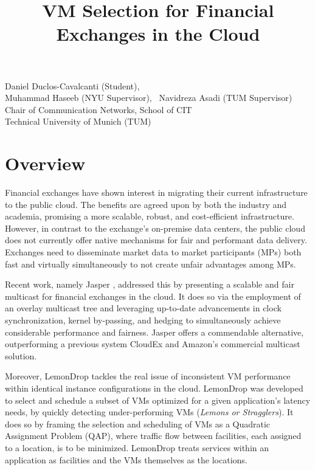 \documentclass{article}
\title{VM Selection for Financial Exchanges in the Cloud}
\makeatletter
\renewcommand{\maketitle}{%
    \thispagestyle{fancy}%
    \begin{center}
        \Large\bfseries\@title
    \end{center}
    \vspace{-0.25cm}
    \begin{center}
        Daniel Duclos-Cavalcanti (Student),
        \\
        Muhammad Haseeb (NYU Supervisor),
        ~Navidreza Asadi (TUM Supervisor) 
        \\Chair of Communication Networks, School of CIT
        \\Technical University of Munich (TUM)
    \end{center}
}
\makeatother
\begin{document}
\maketitle

\section{Overview}

Financial exchanges have shown interest in migrating their current infrastructure 
to the public cloud. The benefits are agreed upon by both the industry and 
academia, promising a more scalable, robust, and cost-efficient infrastructure. 
However, in contrast to the exchange's on-premise data centers, the public cloud does not 
currently offer native mechanisms for fair and performant data delivery. 
Exchanges need to disseminate market data to market participants (MPs) both fast and 
virtually simultaneously to not create unfair advantages among MPs.

Recent work, namely Jasper \cite{haseeb2024jasper}, addressed this by presenting a scalable and fair multicast 
for financial exchanges in the cloud. It does so via the employment of an overlay multicast tree and leveraging 
up-to-date advancements in clock synchronization, kernel by-passing, and hedging to simultaneously 
achieve considerable performance and fairness. Jasper offers a commendable alternative, 
outperforming a previous system CloudEx and Amazon's commercial multicast solution.

Moreover, LemonDrop \cite{sachidananda2022scheduling} tackles the real issue of 
inconsistent VM performance within identical instance configurations in the cloud. 
LemonDrop was developed to select and schedule a subset of VMs optimized for a given application's latency needs, by quickly 
detecting under-performing VMs (\textit{Lemons or Stragglers}).
It does so by framing the selection and scheduling of VMs as a Quadratic Assignment Problem (QAP), where 
traffic flow between facilities, each assigned to a location, is to be minimized. 
LemonDrop treats services within an application as facilities and the VMs themselves as the locations. 

\end{document}
